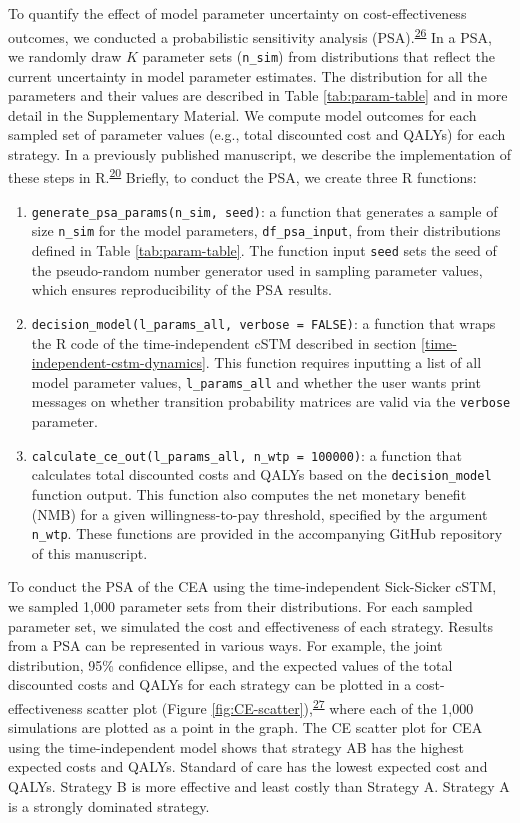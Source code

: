 \documentclass[
]{article}
\begin{document}
To quantify the effect of model parameter uncertainty on cost-effectiveness outcomes, we conducted a probabilistic sensitivity analysis (PSA).\textsuperscript{\protect\hyperlink{ref-Briggs2012}{26}} In a PSA, we randomly draw \(K\) parameter sets (\texttt{n\_sim}) from distributions that reflect the current uncertainty in model parameter estimates. The distribution for all the parameters and their values are described in Table \ref{tab:param-table} and in more detail in the Supplementary Material. We compute model outcomes for each sampled set of parameter values (e.g., total discounted cost and QALYs) for each strategy. In a previously published manuscript, we describe the implementation of these steps in R.\textsuperscript{\protect\hyperlink{ref-Alarid-Escudero2019e}{20}} Briefly, to conduct the PSA, we create three R functions:

\begin{enumerate}
\def\labelenumi{\arabic{enumi}.}
\item
  \texttt{generate\_psa\_params(n\_sim,\ seed)}: a function that generates a sample of size \texttt{n\_sim} for the model parameters, \texttt{df\_psa\_input}, from their distributions defined in Table \ref{tab:param-table}. The function input \texttt{seed} sets the seed of the pseudo-random number generator used in sampling parameter values, which ensures reproducibility of the PSA results.
\item
  \texttt{decision\_model(l\_params\_all,\ verbose\ =\ FALSE)}: a function that wraps the R code of the time-independent cSTM described in section \ref{time-independent-cstm-dynamics}. This function requires inputting a list of all model parameter values, \texttt{l\_params\_all} and whether the user wants print messages on whether transition probability matrices are valid via the \texttt{verbose} parameter.
\item
  \texttt{calculate\_ce\_out(l\_params\_all,\ n\_wtp\ =\ 100000)}: a function that calculates total discounted costs and QALYs based on the \texttt{decision\_model} function output. This function also computes the net monetary benefit (NMB) for a given willingness-to-pay threshold, specified by the argument \texttt{n\_wtp}.
  These functions are provided in the accompanying GitHub repository of this manuscript.
\end{enumerate}

To conduct the PSA of the CEA using the time-independent Sick-Sicker cSTM, we sampled 1,000 parameter sets from their distributions. For each sampled parameter set, we simulated the cost and effectiveness of each strategy. Results from a PSA can be represented in various ways. For example, the joint distribution, 95\% confidence ellipse, and the expected values of the total discounted costs and QALYs for each strategy can be plotted in a cost-effectiveness scatter plot (Figure \ref{fig:CE-scatter}),\textsuperscript{\protect\hyperlink{ref-Briggs2002}{27}} where each of the 1,000 simulations are plotted as a point in the graph. The CE scatter plot for CEA using the time-independent model shows that strategy AB has the highest expected costs and QALYs. Standard of care has the lowest expected cost and QALYs. Strategy B is more effective and least costly than Strategy A. Strategy A is a strongly dominated strategy.
\end{document}

